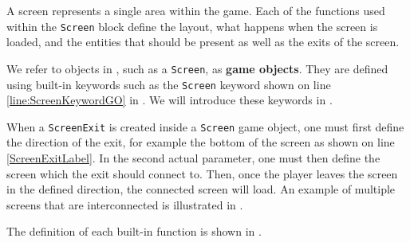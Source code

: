 A screen represents a single area within the game. Each of the functions used within the \texttt{Screen} block define the layout, what happens when the screen is loaded, and the entities that should be present as well as the exits of the screen.

We refer to objects in \dazel{}, such as a \texttt{Screen}, as \textbf{game objects}.
They are defined using built-in keywords such as the \texttt{Screen} keyword shown on line \ref{line:ScreenKeywordGO} in .
We will introduce these keywords in .

When a \texttt{ScreenExit} is created inside a \texttt{Screen} game object, one must first define the direction of the exit, for example the bottom of the screen as shown on line \ref{ScreenExitLabel}.
In the second actual parameter, one must then define the screen which the exit should connect to.
Then, once the player leaves the screen in the defined direction, the connected screen will load. An example of multiple screens that are interconnected is illustrated in .


The definition of each built-in function is shown in .
